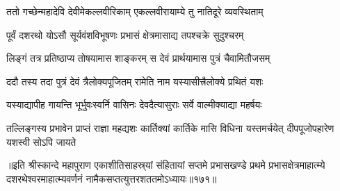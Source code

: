 
\vakta{}
\shrota{}
\tags{}
\notes{}

\storymeta





\twolineshloka
{ततो गच्छेन्महादेवि देवीमेकल्लवीरिकाम्}
{एकल्लवीरायाम्ये तु नातिदूरे व्यवस्थिताम्}%

\twolineshloka
{पूर्वं दशरथो योऽसौ सूर्यवंशविभूषणः}
{प्रभासं क्षेत्रमासाद्य तपश्चक्रे सुदुश्चरम्}%

\twolineshloka
{लिङ्गं तत्र प्रतिष्ठाप्य तोषयामास शाङ्करम्}
{स देवं प्रार्थयामास पुत्रं चैवामितौजसम्}%

\twolineshloka
{ददौ तस्य तदा पुत्रं देवं त्रैलोक्यपूजितम्}
{रामेति नाम यस्यासीत्त्रैलोक्ये प्रथितं यशः}%

\twolineshloka
{यस्याद्यापीह गायन्ति भूर्भुवःस्वर्नि वासिनः}
{देवदैत्यासुराः सर्वे वाल्मीक्याद्या महर्षयः}%

\threelineshloka
{तल्लिङ्गस्य प्रभावेन प्राप्तं राज्ञा महद्यशः}
{कार्तिक्यां कार्तिके मासि विधिना यस्तमर्चयेत्}
{दीपपूजोपहारेण यशस्वी सोऽपि जायते}%

॥इति श्रीस्कान्दे महापुराण एकाशीतिसाहस्र्यां संहितायां सप्तमे प्रभासखण्डे प्रथमे प्रभासक्षेत्रमाहात्म्ये दशरथेश्वरमाहात्म्यवर्णनं नामैकसप्तत्युत्तरशततमोऽध्यायः॥१७१॥
